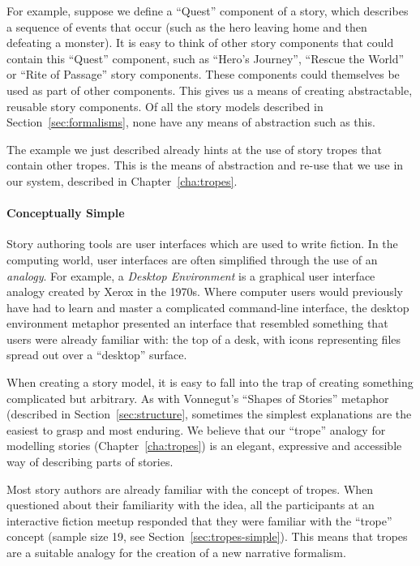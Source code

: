 \documentclass[11pt]{report}
\begin{document}
For example, suppose we define a ``Quest'' component of a story, which describes a
sequence of events that occur (such as the hero leaving home and then defeating
a monster). It is easy to think of other story components that could contain
this ``Quest'' component, such as ``Hero's Journey'', ``Rescue the World'' or
``Rite of Passage'' story components. These components could themselves be used
as part of other components. This gives us a means of creating abstractable,
reusable story components. Of all the story models described in
Section~\ref{sec:formalisms}, none have any means of abstraction such as this.

The example we just described already hints at the use of story tropes that
contain other tropes. This is the means of abstraction and re-use that we use in
our system, described in Chapter~\ref{cha:tropes}.

\paragraph{Conceptually Simple}
Story authoring tools are user interfaces which are used to write fiction. In
the computing world, user interfaces are often simplified through the use of an
\emph{analogy}. For example, a \emph{Desktop Environment} is a graphical user
interface analogy created by Xerox in the 1970s. Where computer users would
previously have had to learn and master a complicated command-line interface,
the desktop environment metaphor presented an interface that resembled something
that users were already familiar with: the top of a desk, with icons
representing files spread out over a ``desktop'' surface.

When creating a story model, it is easy to fall into the trap of creating
something complicated but arbitrary. As with Vonnegut's ``Shapes of Stories''
metaphor (described in Section~\ref{sec:structure}, sometimes the simplest
explanations are the easiest to grasp and most enduring. We believe that our
``trope'' analogy for modelling stories (Chapter~\ref{cha:tropes}) is an
elegant, expressive and accessible way of describing parts of stories.

Most story authors are already familiar with the concept of tropes. When
questioned about their familiarity with the idea, all the participants at an
interactive fiction meetup responded that they were familiar with the ``trope''
concept (sample size 19, see Section~\ref{sec:tropes-simple}). This means that tropes are a
suitable analogy for the creation of a new narrative formalism.
\end{document}
